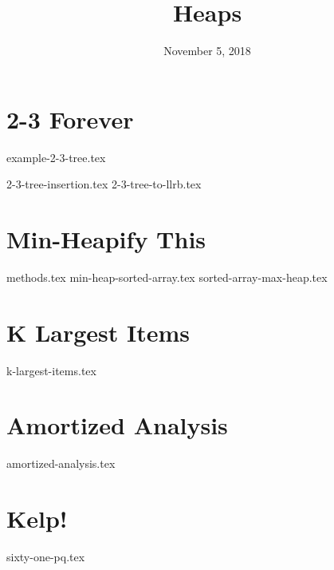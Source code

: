 \documentclass[11pt]{exam}
\title{Heaps}
\date{November 5, 2018}
\begin{document}
\maketitle

\section{2-3 Forever}
{example-2-3-tree.tex}
\begin{questions}
{2-3-tree-insertion.tex}
{2-3-tree-to-llrb.tex}
\end{questions}

\section{Min-Heapify This}
\begin{questions}
{methods.tex}
{min-heap-sorted-array.tex}
{sorted-array-max-heap.tex}
\end{questions}

\section{K Largest Items}
\begin{questions}
{k-largest-items.tex}
\end{questions}

\section{Amortized Analysis}
\begin{questions}
{amortized-analysis.tex}
\end{questions}

\section{Kelp!}
\begin{questions}
{sixty-one-pq.tex}
\end{questions}
\end{document}
